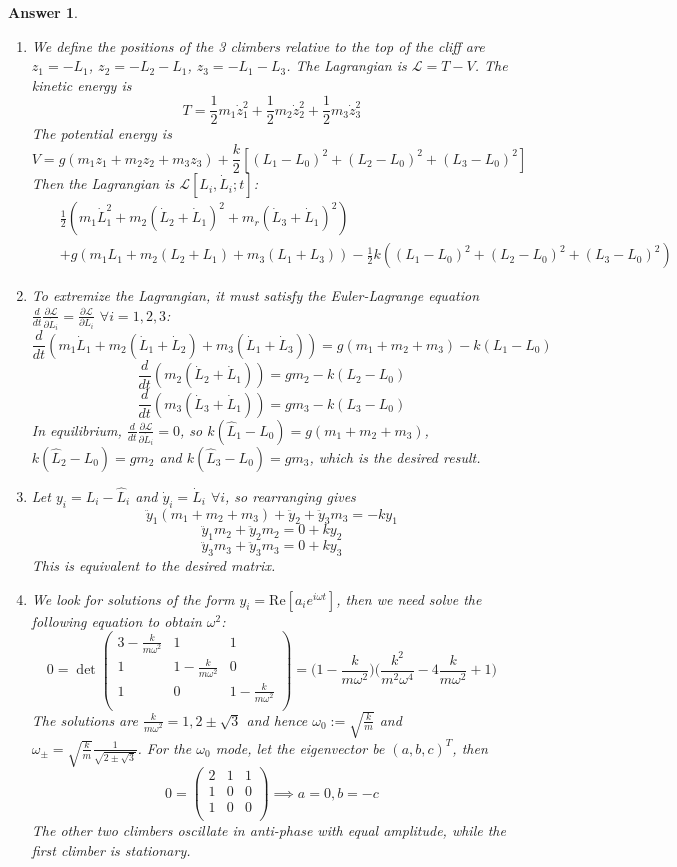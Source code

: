 \documentclass[a4paper]{article}
\newtheorem{ans}{Answer}[section]
\theoremstyle{new}
\begin{document}
\newpage
\begin{ans}\leavevmode
\begin{enumerate}[label=(\alph*)]
\item We define the positions of the 3 climbers relative to the top of the cliff are $z_1=-L_1$, $z_2=-L_2-L_1$, $z_3=-L_1-L_3$. The Lagrangian is $\mathcal{L}=T-V$. The kinetic energy is
$$T=\frac{1}{2}m_1\dot{z}_1^2+\frac{1}{2}m_2\dot{z}_2^2+\frac{1}{2}m_3\dot{z}_3^2$$
The potential energy is
$$V=g(m_1z_1+m_2z_2+m_3z_3)+\frac{k}{2}[(L_1-L_0)^2+(L_2-L_0)^2+(L_3-L_0)^2]$$
Then the Lagrangian is $\mathcal{L}[L_i,\dot{L}_i;t]$:
\begin{eqnarray}
&&\frac{1}{2}(m_1\dot{L}_1^2+m_2(\dot{L}_2+\dot{L}_1)^2+m_r(\dot{L}_3+\dot{L}_1)^2)\nonumber\\&&+g(m_1L_1+m_2(L_2+L_1)+m_3(L_1+L_3))-\frac{1}{2}k((L_1-L_0)^2+(L_2-L_0)^2+(L_3-L_0)^2)\nonumber
\end{eqnarray}
\item To extremize the Lagrangian, it must satisfy the Euler-Lagrange equation $\frac{d}{dt}\frac{\partial\mathcal{L}}{\partial\dot{L}_i}=\frac{\partial\mathcal{L}}{\partial L_i}$ $\forall i=1,2,3$:
$$\frac{d}{dt}(m_1\dot{L}_1+m_2(\dot{L}_1+\dot{L}_2)+m_3(\dot{L}_1+\dot{L}_3))=g(m_1+m_2+m_3)-k(L_1-L_0)$$
$$\frac{d}{dt}(m_2(\dot{L}_2+\dot{L}_1))=gm_2-k(L_2-L_0)$$
$$\frac{d}{dt}(m_3(\dot{L}_3+\dot{L}_1))=gm_3-k(L_3-L_0)$$
In equilibrium, $\frac{d}{dt}\frac{\partial\mathcal{L}}{\partial\dot{L}_i}=0$, so $k(\hat{L}_1-L_0)=g(m_1+m_2+m_3)$, $k(\hat{L}_2-L_0)=gm_2$ and $k(\hat{L}_3-L_0)=gm_3$, which is the desired result.
\item Let $y_i=L_i-\hat{L}_i$ and $\dot{y}_i=\dot{L}_i$ $\forall i$, so rearranging gives
$$\ddot{y}_1(m_1+m_2+m_3)+\ddot{y}_2+\ddot{y}_3m_3=-ky_1$$
$$\ddot{y}_1m_2+\ddot{y}_2m_2=0+ky_2$$
$$\ddot{y}_3m_3+\ddot{y}_3m_3=0+ky_3$$
This is equivalent to the desired matrix.
\item We look for solutions of the form $y_i=\text{Re}[a_ie^{i\omega t}]$, then we need solve the following equation to obtain $\omega^2$:
$$0=\det\begin{pmatrix}3-\frac{k}{m\omega^2}&1&1\\1&1-\frac{k}{m\omega^2}&0\\1&0&1-\frac{k}{m\omega^2}\\\end{pmatrix}=\bigg(1-\frac{k}{m\omega^2}\bigg)\bigg(\frac{k^2}{m^2\omega^4}-4\frac{k}{m\omega^2}+1\bigg)$$
The solutions are $\frac{k}{m\omega^2}=1,2\pm\sqrt{3}$ and hence $\omega_0:=\sqrt{\frac{k}{m}}$ and $\omega_\pm=\sqrt{\frac{k}{m}}\frac{1}{\sqrt{2\pm\sqrt{3}}}$.
For the $\omega_0$ mode, let the eigenvector be $(a,b,c)^T$, then
$$0=\begin{pmatrix}2&1&1\\1&0&0\\1&0&0\\\end{pmatrix}\implies a=0,b=-c$$
The other two climbers oscillate in anti-phase with equal amplitude, while the first climber is stationary.
\end{enumerate}
\end{ans}
\end{document}
